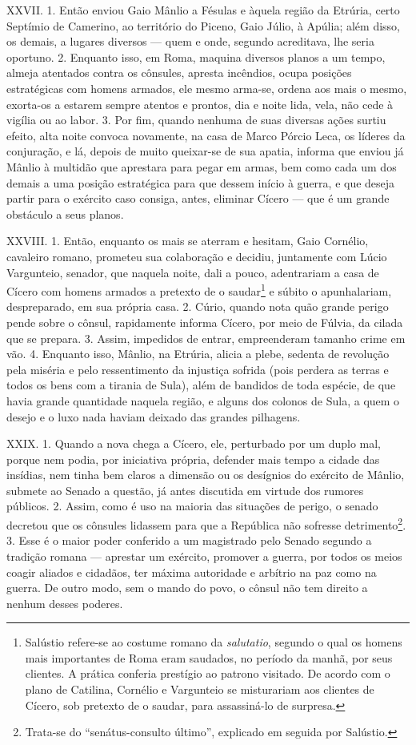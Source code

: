 XXVII. 1. Então enviou Gaio Mânlio a Fésulas e àquela região da Etrúria, certo
Septímio de Camerino, ao território do Piceno, Gaio Júlio, à Apúlia; além disso, os
demais, a lugares diversos --- quem e onde, segundo acreditava, lhe seria
oportuno. 2. Enquanto isso, em Roma, maquina diversos planos a um tempo, almeja
atentados contra os cônsules, apresta incêndios, ocupa posições estratégicas
com homens armados, ele mesmo arma-se, ordena aos mais o mesmo, exorta-os a
estarem sempre atentos e prontos, dia e noite lida, vela, não cede à vigília ou
ao labor. 3. Por fim, quando nenhuma de suas diversas ações surtiu efeito, alta
noite convoca novamente, na casa de Marco Pórcio Leca, os líderes da
conjuração, e lá, depois de muito queixar-se de sua apatia, informa que enviou
já Mânlio à multidão que aprestara para pegar em armas, bem como cada um dos
demais a uma posição estratégica para que dessem início à guerra, e que deseja
partir para o exército caso consiga, antes, eliminar Cícero --- que  é um
grande obstáculo a seus planos.

XXVIII. 1. Então, enquanto os mais se aterram e hesitam, Gaio Cornélio,
cavaleiro romano, prometeu sua colaboração e decidiu, juntamente com Lúcio
Vargunteio, senador, que naquela noite, dali a pouco, adentrariam a casa de
Cícero com homens armados a pretexto de o saudar\footnote{Salústio refere-se ao
costume romano da \emph{salutatio}, segundo o qual os homens mais importantes
de Roma eram saudados, no período da manhã, por seus clientes. A prática
conferia prestígio ao patrono visitado. De acordo com o plano de Catilina,
Cornélio e Vargunteio se misturariam aos clientes de Cícero, sob pretexto de o
saudar, para assassiná-lo de surpresa.} e súbito o apunhalariam, despreparado,
em sua própria casa. 2. Cúrio, quando nota quão grande perigo pende sobre o
cônsul, rapidamente informa Cícero, por meio de Fúlvia, da cilada que se
prepara. 3. Assim, impedidos de entrar, empreenderam tamanho crime em vão. 4.
Enquanto isso, Mânlio, na Etrúria, alicia a plebe, sedenta de revolução pela
miséria e pelo ressentimento da injustiça sofrida (pois perdera as terras e
todos os bens com a tirania de Sula), além de bandidos de toda espécie, de que
havia grande quantidade naquela região, e alguns dos colonos de Sula, a quem o
desejo e o luxo nada haviam deixado das grandes pilhagens.

XXIX. 1. Quando a nova chega a Cícero, ele, perturbado por um duplo mal, porque
nem podia, por iniciativa própria, defender mais tempo a cidade das insídias,
nem tinha bem claros a dimensão ou os desígnios do exército de Mânlio, submete
ao Senado a questão, já antes discutida em virtude dos rumores públicos. 2.
Assim, como é uso na maioria das situações de perigo, o senado decretou que os
cônsules lidassem para que a República não sofresse
detrimento\footnote{Trata-se do 
``senátus-consulto último'', explicado em seguida por Salústio.}. 3. Esse é o
maior poder conferido a um magistrado pelo Senado segundo a tradição romana ---
aprestar um exército, promover a guerra, por todos os meios coagir aliados e
cidadãos, ter máxima autoridade e arbítrio na paz como na guerra. De outro
modo, sem o mando do povo, o cônsul não tem direito a nenhum desses poderes. 

